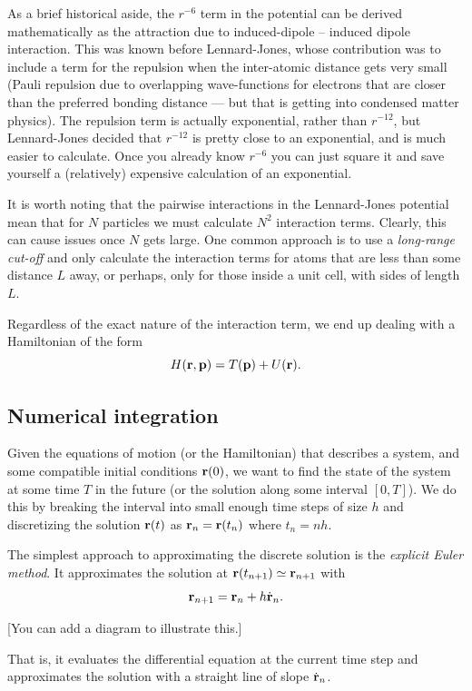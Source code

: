 \documentclass{article}
\begin{document}
As a brief historical aside, the $r^{-6}$ term in the potential can be derived mathematically as the attraction due to induced-dipole -- induced dipole interaction. This was known before Lennard-Jones, whose contribution was to include a term for the repulsion when the inter-atomic distance gets very small (Pauli repulsion due to overlapping wave-functions for electrons that are closer than the preferred bonding distance --- but that is getting into condensed matter physics). The repulsion term is actually exponential, rather than $r^{-12}$, but Lennard-Jones decided that $r^{-12}$ is pretty close to an exponential, and is much easier to calculate. Once you already know $r^{-6}$ you can just square it and save yourself a (relatively) expensive calculation of an exponential.

It is worth noting that the pairwise interactions in the Lennard-Jones potential mean that for $N$ particles we must calculate $N^2$ interaction terms. Clearly, this can cause issues once $N$ gets large. One common approach is to use a \emph{long-range cut-off} and only calculate the interaction terms for atoms that are less than some distance $L$ away, or perhaps, only for those inside a unit cell, with sides of length $L$.

Regardless of the exact nature of the interaction term, we end up dealing with a Hamiltonian of the form 
$$
	H({\bf r},{\bf p}) = T({\bf p}) + U({\bf r}).
$$

\subsection{Numerical integration}
Given the equations of motion (or the Hamiltonian) that describes a system, and some compatible initial conditions ${\bf r}(0)$, we want to find the state of the system at some time $T$ in the future (or the solution along some interval $[0,T]$). We do this by breaking the interval into small enough time steps of size $h$ and discretizing the solution ${\bf r}(t)$ as ${\bf r}_n = {\bf r}(t_n) $ where $t_n = nh$.

The simplest approach to approximating the discrete solution is the \emph{explicit Euler method}. It approximates the solution at ${\bf r}(t_{n+1})\simeq {\bf r}_{n+1}$ with
$$
	{\bf r}_{n+1} = {\bf r}_n + h \dot{\bf r}_n.
$$

[You can add a diagram to illustrate this.]

That is, it evaluates the differential equation at the current time step and approximates the solution with a straight line of slope $\dot{\bf r}_n$.
\end{document}
